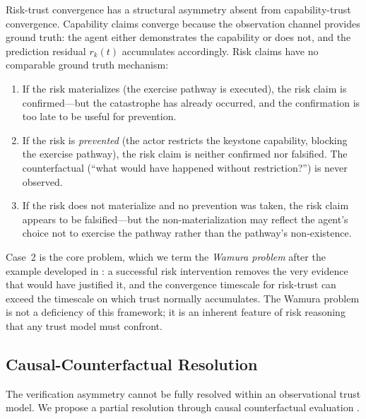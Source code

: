 \begin{remark}
\label{rem:verification}
Risk-trust convergence has a structural asymmetry absent from
    capability-trust convergence. Capability claims converge because the
    observation channel provides ground truth: the agent either demonstrates
    the capability or does not, and the prediction residual $r_k(t)$
    accumulates accordingly. Risk claims have no comparable ground truth
    mechanism:
\begin{enumerate}
\item If the risk materializes (the exercise pathway is executed), the
    risk claim is confirmed---but the catastrophe has already occurred, and
    the confirmation is too late to be useful for prevention.
\item If the risk is \emph{prevented} (the actor restricts the keystone
    capability, blocking the exercise pathway), the risk claim is neither
    confirmed nor falsified. The counterfactual (``what would have happened
    without restriction?'') is never observed.
\item If the risk does not materialize and no prevention was taken, the
    risk claim appears to be falsified---but the non-materialization may
    reflect the agent's choice not to exercise the pathway rather than the
    pathway's non-existence.
\end{enumerate}
\end{remark}

Case~2 is the core problem, which we term the \emph{Wamura problem} after the
example developed in \citet{lasser2026poset}: a successful risk intervention
removes the very evidence that would have justified it, and the convergence
timescale for risk-trust can exceed the timescale on which trust normally
accumulates. The Wamura problem is not a deficiency of this framework; it is
an inherent feature of risk reasoning that any trust model must confront.

\subsection{Causal-Counterfactual Resolution}

The verification asymmetry cannot be fully resolved within an observational
trust model. We propose a partial resolution through causal counterfactual
evaluation \citep{pearl2009causality, spirtes2000causation}.

